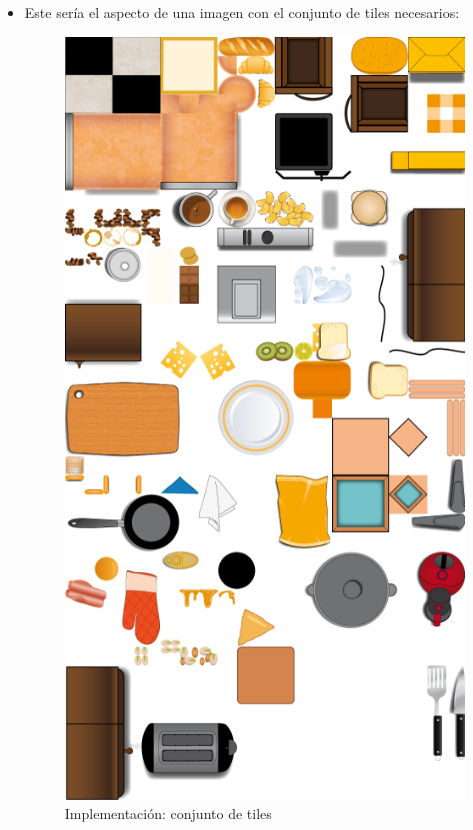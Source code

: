 \begin{itemize}

    \item Este sería el aspecto de una imagen con el conjunto de tiles necesarios:
    \begin{figure}[H]
      \label{tileset}
      \begin{center}
        \includegraphics[scale=0.3]{imagenes/tileset.png}
      \end{center}
      \caption{Implementación: conjunto de tiles}
    \end{figure}
    

\end{itemize}

